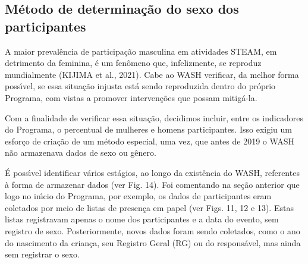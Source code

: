 \documentclass[
12pt,		%
openright,	%
twoside,  %
a4paper,			%
chapter=TITLE,		%
english,			%
french,				%
spanish,			%
brazil				%
]{USPSC-classe/USPSC}
\begin{document}
\subsection[M\'etodo de determina\c{c}\~ao do sexo dos participantes]{M\'etodo de determina\c{c}\~ao do sexo dos participantes}\label{M\'etodo de determina\c{c}\~ao do sexo dos participantes}
A maior preval\^encia de participa\c{c}\~ao masculina em atividades STEAM, em detrimento da feminina, \'e um fen\^omeno que, infelizmente, se reproduz mundialmente (KIJIMA et al., 2021). Cabe ao WASH verificar, da melhor forma poss\'{\i}vel, se essa situa\c{c}\~ao injusta est\'a sendo reproduzida dentro do pr\'oprio Programa, com vistas a promover interven\c{c}\~oes que possam mitig\'a-la.

















Com a finalidade de verificar essa situa\c{c}\~ao, decidimos incluir, entre os indicadores do Programa, o percentual de mulheres e homens participantes. Isso exigiu um esfor\c{c}o de cria\c{c}\~ao de um m\'etodo especial, uma vez, que antes de 2019 o WASH n\~ao armazenava dados de sexo ou g\^enero.

















\'E poss\'{\i}vel identificar v\'arios est\'agios, ao longo da exist\^encia do WASH, referentes \`a forma de armazenar dados (ver Fig. 14). Foi comentando na se\c{c}\~ao anterior que logo no in\'{\i}cio do Programa, por exemplo, os dados de participantes eram coletados por meio de listas de presen\c{c}a em papel (ver Figs. 11, 12 e 13). Estas listas registravam apenas o nome dos participantes e a data do evento, sem registro de sexo. Posteriormente, novos dados foram sendo coletados, como o ano do nascimento da crian\c{c}a, seu Registro Geral (RG) ou do respons\'avel, mas ainda sem registrar o sexo.
\end{document}
